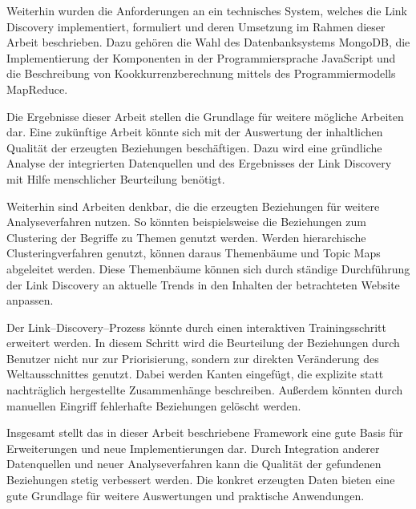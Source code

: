 Weiterhin wurden die Anforderungen an ein technisches System, welches die Link Discovery implementiert, formuliert und deren Umsetzung im Rahmen dieser Arbeit beschrieben. Dazu gehören die Wahl des Datenbanksystems MongoDB, die Implementierung der Komponenten in der Programmiersprache JavaScript und die Beschreibung von Kookkurrenzberechnung mittels des Programmiermodells MapReduce.

Die Ergebnisse dieser Arbeit stellen die Grundlage für weitere mögliche Arbeiten dar. Eine zukünftige Arbeit könnte sich mit der Auswertung der inhaltlichen Qualität der erzeugten Beziehungen beschäftigen. Dazu wird eine gründliche Analyse der integrierten Datenquellen und des Ergebnisses der Link Discovery mit Hilfe menschlicher Beurteilung benötigt.

Weiterhin sind Arbeiten denkbar, die die erzeugten Beziehungen für weitere Analyseverfahren nutzen. So könnten beispielsweise die Beziehungen zum Clustering der Begriffe zu Themen genutzt werden. Werden hierarchische Clusteringverfahren genutzt, können daraus Themenbäume und Topic Maps abgeleitet werden. Diese Themenbäume können sich durch ständige Durchführung der Link Discovery an aktuelle Trends in den Inhalten der betrachteten Website anpassen.

Der Link--Discovery--Prozess könnte durch einen interaktiven Trainingsschritt erweitert werden. In diesem Schritt wird die Beurteilung der Beziehungen durch Benutzer nicht nur zur Priorisierung, sondern zur direkten Veränderung des Weltausschnittes genutzt. Dabei werden Kanten eingefügt, die explizite statt nachträglich hergestellte Zusammenhänge beschreiben. Außerdem könnten durch manuellen Eingriff fehlerhafte Beziehungen gelöscht werden.

Insgesamt stellt das in dieser Arbeit beschriebene Framework eine gute Basis für Erweiterungen und neue Implementierungen dar. Durch Integration anderer Datenquellen und neuer Analyseverfahren kann die Qualität der gefundenen Beziehungen stetig verbessert werden. Die konkret erzeugten Daten bieten eine gute Grundlage für weitere Auswertungen und praktische Anwendungen.